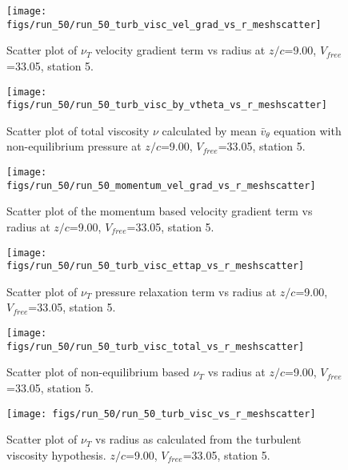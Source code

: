 \begin{figure}[H]
\centering
\texttt{[image: figs/run\_50/run\_50\_turb\_visc\_vel\_grad\_vs\_r\_meshscatter]}
\caption{Scatter plot of $\nu_T$ velocity gradient term vs radius at $z/c$=9.00, $V_{free}$=33.05, station 5.}
\end{figure}


\begin{figure}[H]
\centering
\texttt{[image: figs/run\_50/run\_50\_turb\_visc\_by\_vtheta\_vs\_r\_meshscatter]}
\caption{Scatter plot of total viscosity $\nu$ calculated by mean $\bar{v}_{\theta}$ equation with non-equilibrium pressure at $z/c$=9.00, $V_{free}$=33.05, station 5.}
\end{figure}


\begin{figure}[H]
\centering
\texttt{[image: figs/run\_50/run\_50\_momentum\_vel\_grad\_vs\_r\_meshscatter]}
\caption{Scatter plot of the momentum based velocity gradient term vs radius at $z/c$=9.00, $V_{free}$=33.05, station 5.}
\end{figure}


\begin{figure}[H]
\centering
\texttt{[image: figs/run\_50/run\_50\_turb\_visc\_ettap\_vs\_r\_meshscatter]}
\caption{Scatter plot of $\nu_T$ pressure relaxation term vs radius at $z/c$=9.00, $V_{free}$=33.05, station 5.}
\end{figure}


\begin{figure}[H]
\centering
\texttt{[image: figs/run\_50/run\_50\_turb\_visc\_total\_vs\_r\_meshscatter]}
\caption{Scatter plot of non-equilibrium based $\nu_T$ vs radius at $z/c$=9.00, $V_{free}$=33.05, station 5.}
\end{figure}


\begin{figure}[H]
\centering
\texttt{[image: figs/run\_50/run\_50\_turb\_visc\_vs\_r\_meshscatter]}
\caption{Scatter plot of $\nu_T$ vs radius as calculated from the turbulent viscosity hypothesis. $z/c$=9.00, $V_{free}$=33.05, station 5.}
\end{figure}


